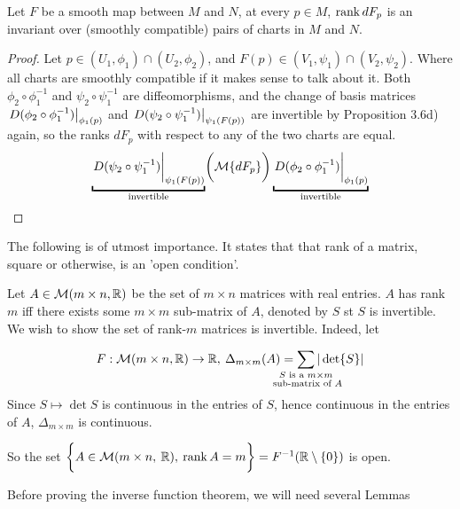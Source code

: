 \documentclass[../main-manifolds.tex]{subfiles}
\begin{document}
\begin{wts}\label{lee-chap3:rank-of-differential-invariant-under-coordinate-change}
    Let $F$ be a smooth map between $M$ and $N$, at every $p\in M$, $\operatorname{rank} dF_p$ is an invariant over (smoothly compatible) pairs of charts in $M$ and $N$.
\end{wts}
\begin{proof}
    Let $p\in (U_1,\phi_1)\cap (U_2,\phi_2)$, and $F(p)\in (V_1,\psi_1)\cap (V_2,\psi_2)$. Where all charts are smoothly compatible if it makes sense to talk about it. Both $\phi_2\circ\phi_1^{-1}$ and $\psi_2\circ\psi_1^{-1}$ are diffeomorphisms, and the change of basis matrices $\eval{D(\phi_2\circ\phi_1^{-1})}_{\phi_1(p)}$ and $\eval{D(\psi_2\circ\psi_1^{-1})}_{\psi_1(F(p))}$ are invertible by Proposition 3.6d) again, so the ranks $dF_p$ with respect to any of the two charts are equal.
    \[
        \underbracket{\eval{D(\psi_2\circ\psi_1^{-1})}_{\psi_1(F(p))}}_{\text{invertible}}\biggl(\mcal\{dF_p\}\biggr)\underbracket{\eval{D(\phi_2\circ\phi_1^{-1})}_{\phi_1(p)}}_{\text{invertible}}
    \]
\end{proof}

\newpage

The following is of utmost importance. It states that that rank of a matrix, square or otherwise, is an 'open condition'.
\begin{example}\label{lee-chp4:example-1.28-matrices-of-full-rank}
Let $A\in\mathcal{M}({m\times n,\mathbb{R}})$ be the set of $m\times n$ matrices with real entries. $A$ has rank $m$ iff there exists some $m\times m$ sub-matrix of $A$, denoted by $S$ st $S$ is invertible. We wish to show the set of rank-$m$ matrices is invertible. Indeed, let 

\[
F:\mcal({m\times n,\real})\to \real,\: \Delta_{m\times m}(A) = \sum_{\mathclap{\substack{S\text{ is a } m\times m \\ \text{ sub-matrix of } A}}}|\det{S}|
\]
Since $S\mapsto \det{S}$ is continuous in the entries of $S$, hence continuous in the entries of $A$, $\Delta_{m\times m}$ is continuous.

So the set $\biggl\{{A\in\mathcal{M}{(m\times n,\: \mathbb{R})},\: \operatorname{rank}{A}=m}\biggr\}=F^{-1}(\mathbb{R}\setminus\{0\})$ is open.
\end{example}

Before proving the inverse function theorem, we will need several Lemmas
\end{document}
